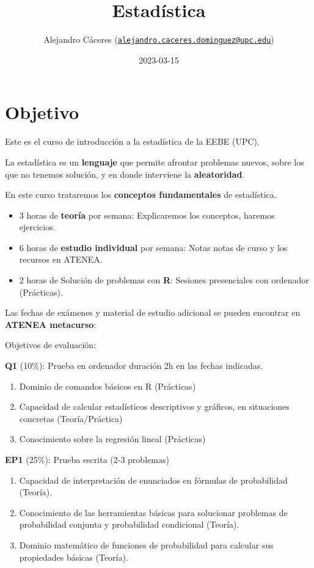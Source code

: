 \documentclass[
]{book}
\title{Estadística}
\author{Alejandro Cáceres (\href{mailto:alejandro.caceres.dominguez@upc.edu}{\nolinkurl{alejandro.caceres.dominguez@upc.edu}})}
\date{2023-03-15}
\providecommand{\tightlist}{%
  \setlength{\itemsep}{0pt}\setlength{\parskip}{0pt}}
\begin{document}
\maketitle

{
\setcounter{tocdepth}{1}
\tableofcontents
}
\hypertarget{objetivo}{%
\chapter{Objetivo}\label{objetivo}}

Este es el curso de introducción a la estadística de la EEBE (UPC).

La estadística es un \textbf{lenguaje} que permite afrontar problemas nuevos, sobre los que no tenemos solución, y en donde interviene la \textbf{aleatoridad}.

En este curso trataremos los \textbf{conceptos fundamentales} de estadística.

\begin{itemize}
\item
  3 horas de \textbf{teoría} por semana: Explicaremos los conceptos, haremos ejercicios.
\item
  6 horas de \textbf{estudio individual} por semana: Notas notas de curso y los recursos en ATENEA.
\item
  2 horas de Solución de problemas con \textbf{R}: Sesiones presenciales con ordenador (Prácticas).
\end{itemize}

Las fechas de exámenes y material de estudio adicional se pueden encontrar en \textbf{ATENEA metacurso}:

Objetivos de evaluación:

\textbf{Q1} (10\%): Prueba en ordenador duración 2h en las fechas indicadas.

\begin{enumerate}
\def\labelenumi{\alph{enumi}.}
\tightlist
\item
  Dominio de comandos básicos en R (Prácticas)
\item
  Capacidad de calcular estadísticos descriptivos y gráficos, en situaciones concretas (Teoría/Práctica)
\item
  Conocimiento sobre la regresión lineal (Prácticas)
\end{enumerate}

\textbf{EP1} (25\%): Prueba escrita (2-3 problemas)

\begin{enumerate}
\def\labelenumi{\alph{enumi}.}
\tightlist
\item
  Capacidad de interpretación de enunciados en fórmulas de probabilidad (Teoría).
\item
  Conocimiento de las herramientas básicas para solucionar problemas de probabilidad conjunta y probabilidad condicional (Teoría).
\item
  Dominio matemático de funciones de probabilidad para calcular sus propiedades básicas (Teoría).
\end{enumerate}
\end{document}
